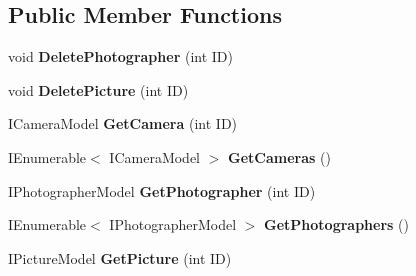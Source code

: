 \subsection*{Public Member Functions}
\begin{DoxyCompactItemize}
\item 
\mbox{\label{class_pic_d_b_1_1_mocks_1_1_mock_data_access_layer_a98c6893cae59bb72b799129776712ebf}} 
void {\bfseries Delete\+Photographer} (int ID)
\item 
\mbox{\label{class_pic_d_b_1_1_mocks_1_1_mock_data_access_layer_a64df961a433f1d99870e22cfb132eee0}} 
void {\bfseries Delete\+Picture} (int ID)
\item 
\mbox{\label{class_pic_d_b_1_1_mocks_1_1_mock_data_access_layer_ad97ea95a78c4ee68323665763da91007}} 
I\+Camera\+Model {\bfseries Get\+Camera} (int ID)
\item 
\mbox{\label{class_pic_d_b_1_1_mocks_1_1_mock_data_access_layer_ad996ee27f2b414ce2015c39d5aecbdde}} 
I\+Enumerable$<$ I\+Camera\+Model $>$ {\bfseries Get\+Cameras} ()
\item 
\mbox{\label{class_pic_d_b_1_1_mocks_1_1_mock_data_access_layer_a2f2f205771b7c8153e57320b00c4105d}} 
I\+Photographer\+Model {\bfseries Get\+Photographer} (int ID)
\item 
\mbox{\label{class_pic_d_b_1_1_mocks_1_1_mock_data_access_layer_a86c530e162fb78a651f8b1243058f00c}} 
I\+Enumerable$<$ I\+Photographer\+Model $>$ {\bfseries Get\+Photographers} ()
\item 
\mbox{\label{class_pic_d_b_1_1_mocks_1_1_mock_data_access_layer_a39edd00df7e3579ded2592d0f1d8e399}} 
I\+Picture\+Model {\bfseries Get\+Picture} (int ID)
\item 
\mbox{\label{class_pic_d_b_1_1_mocks_1_1_mock_data_access_layer_aee45af16f1f9c40f00cce89befae2148}} 

\end{DoxyCompactItemize}
